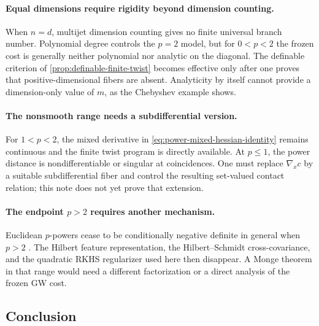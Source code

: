 \documentclass[11pt,a4paper]{article}
\theoremstyle{definition}
\theoremstyle{remark}
\begin{document}
\paragraph{Equal dimensions require rigidity beyond dimension counting.}
When \(n=d\), multijet dimension counting gives no finite universal branch
number.  Polynomial degree controls the \(p=2\) model, but for
\(0<p<2\) the frozen cost is generally neither polynomial nor analytic on the
diagonal.  The definable criterion of
\cref{prop:definable-finite-twist} becomes effective only after one proves
that positive-dimensional fibers are absent.  Analyticity by itself cannot
provide a dimension-only value of \(m\), as the Chebyshev example shows.

\paragraph{The nonsmooth range needs a subdifferential version.}
For \(1<p<2\), the mixed derivative in
\eqref{eq:power-mixed-hessian-identity} remains continuous and the finite
twist program is directly available.  At \(p\leq1\), the power distance is
nondifferentiable or singular at coincidences.  One must replace
\(\nabla_xc\) by a suitable subdifferential fiber and control the resulting
set-valued contact relation; this note does not yet prove that extension.

\paragraph{The endpoint \(p>2\) requires another mechanism.}
Euclidean \(p\)-powers cease to be conditionally negative definite in
general when \(p>2\) \citep{Schoenberg1938}.  The Hilbert feature
representation, the Hilbert--Schmidt cross-covariance, and the quadratic RKHS
regularizer used here then disappear.  A Monge theorem in that range would
need a different factorization or a direct analysis of the frozen GW cost.

\subsection*{Conclusion}
\end{document}
